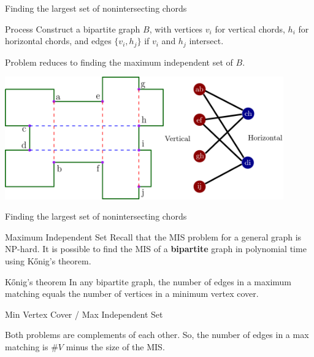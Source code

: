 \documentclass{beamer}
\begin{document}
\begin{frame}[t]{Finding the largest set of nonintersecting chords}	
	\begin{block}{Process}
	Construct a bipartite graph $B$, with vertices $v_i$ for vertical chords, $h_i$ for horizontal chords, and edges $\{v_i, h_j\}$ if $v_i$ and $h_j$ intersect.
	
	Problem reduces to finding the maximum independent set of $B$.

	
	\end{block}
	\centering
    \includegraphics[width=0.9\textwidth]{graph0.png}

\end{frame}

\begin{frame}[t]{Finding the largest set of nonintersecting chords}	
	\begin{block}{Maximum Independent Set}
	Recall that the MIS problem for a general graph is NP-hard. 	
	It is possible to find the MIS of a \textbf{bipartite} graph in polynomial time using Kőnig's theorem.
	
	\end{block}

	\begin{block}{Kőnig's theorem}
    In any bipartite graph, the number of edges in a maximum matching equals the number of vertices in a minimum vertex cover.
    	
	\end{block}

	\begin{block}{Min Vertex Cover / Max Independent Set}
	
	Both problems are complements of each other. So, the number of edges in a max matching is $\#V$ minus the size of the MIS.	
	    	
	\end{block}

\end{frame}
\end{document}
